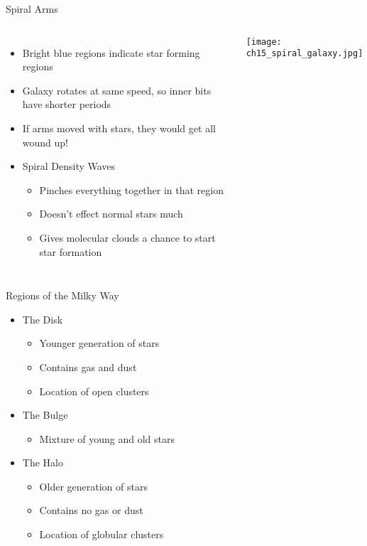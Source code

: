 \documentclass[pdf,aspectratio=169]{beamer}
\begin{document}
\begin{frame}{Spiral Arms}
  \begin{columns}
	\begin{itemize}
	  \item Bright blue regions indicate star forming regions
	  \item Galaxy rotates at same speed, so inner bits have shorter periods
	  \item If arms moved with stars, they would get all wound up!
	  \item Spiral Density Waves
		\begin{itemize}
		  \item Pinches everything together in that region
		  \item Doesn't effect normal stars much
		  \item Gives molecular clouds a chance to start star formation
		\end{itemize}
	\end{itemize}
	\begin{center}
	  \texttt{[image: ch15\_spiral\_galaxy.jpg]}
	\end{center}
  \end{columns}
\end{frame}

\begin{frame}{Regions of the Milky Way}
  \begin{itemize}
	\item The Disk
	  \begin{itemize}
		\item Younger generation of stars
		\item Contains gas and dust
		\item Location of open clusters
	  \end{itemize}
	\item The Bulge
	  \begin{itemize}
		\item Mixture of young and old stars
	  \end{itemize}
	\item The Halo
	  \begin{itemize}
		\item Older generation of stars
		\item Contains no gas or dust
		\item Location of globular clusters
	  \end{itemize}
  \end{itemize}
\end{frame}
\end{document}
